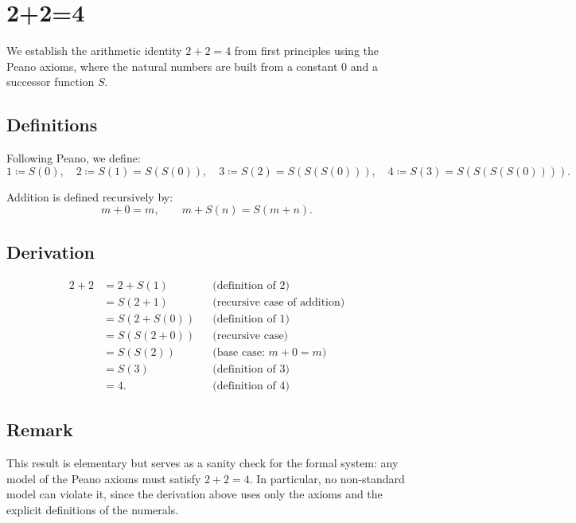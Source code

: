 \section*{2+2=4}

We establish the arithmetic identity $2 + 2 = 4$ from first principles using the
Peano axioms, where the natural numbers are built from a constant $0$ and a
successor function $S$.

\subsection*{Definitions}

Following Peano, we define:
\[
  1 \coloneqq S(0), \quad
  2 \coloneqq S(1) = S(S(0)), \quad
  3 \coloneqq S(2) = S(S(S(0))), \quad
  4 \coloneqq S(3) = S(S(S(S(0)))).
\]

Addition is defined recursively by:
\[
  m + 0 = m, \qquad m + S(n) = S(m + n).
\]

\subsection*{Derivation}

\begin{align*}
  2 + 2
    &= 2 + S(1)      && \text{(definition of } 2\text{)} \\
    &= S(2 + 1)      && \text{(recursive case of addition)} \\
    &= S(2 + S(0))   && \text{(definition of } 1\text{)} \\
    &= S(S(2 + 0))   && \text{(recursive case)} \\
    &= S(S(2))       && \text{(base case: } m + 0 = m\text{)} \\
    &= S(3)          && \text{(definition of } 3\text{)} \\
    &= 4.            && \text{(definition of } 4\text{)}
\end{align*}

\subsection*{Remark}

This result is elementary but serves as a sanity check for the formal system:
any model of the Peano axioms must satisfy $2 + 2 = 4$.  In particular, no
non-standard model can violate it, since the derivation above uses only the
axioms and the explicit definitions of the numerals.
